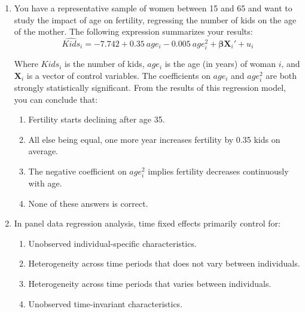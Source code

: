 \documentclass{article}
\begin{document}
\begin{enumerate}
where $X_i$ is correlated with $u_i$ and $Z_i$ is an instrument. Suppose that $E[u_i~\vert~ W_{i}] = 0$; $\{X_{i}, W_{i}, Z_{i}, Y_i\}$ are i.i.d. draws from their joint
distribution and that large outliers are unlikely. Under which condition(s) would $Z_i$ fail to be a relevant instrument?

\begin{enumerate}[label=\alph*)]
\item $Z_i = X_i$
\item $W_i = 1$ for all i
\item $Z_i$ is independent of $(Y_i, X_i, W_i)$
\item All of these answers are correct
\end{enumerate}\vspace{.25cm}


\item You have a representative sample of women between 15 and 65 and want to study the impact of age on fertility, regressing the number of kids on the age of the mother. The following expression summarizes your results:
\begin{equation*}
    \widehat{Kids}_i = -7.742 + 0.35~age_i - 0.005~age_i^2 + \mathbf{\beta}\textbf{X}_{i}' + u_i
\end{equation*}

Where $Kids_i$ is the number of kids, $age_i$ is the age (in years) of woman $i$, and $\textbf{X}_{i}$ is a vector of control variables. The coefficients on $age_i$ and $age_i^2$ are both strongly statistically significant. From the results of this regression model, you can conclude that:

\begin{enumerate}[label=\alph*)]
\item Fertility starts declining after age 35.
\item All else being equal, one more year increases fertility by 0.35 kids on average.
\item The negative coefficient on  $age_i^2$ implies fertility decreases continuously with age.
\item None of these answers is correct.
\end{enumerate}\vspace{.25cm}

    \item In panel data regression analysis, time fixed effects primarily control for:
    \begin{enumerate}[label=\alph*)]
        \item Unobserved individual-specific characteristics.
        \item Heterogeneity across time periods that does not vary between individuals.
        \item Heterogeneity across time periods that varies between individuals.
        \item Unobserved time-invariant characteristics.
    \end{enumerate}\vspace{.25cm}




\end{enumerate}
\end{document}
